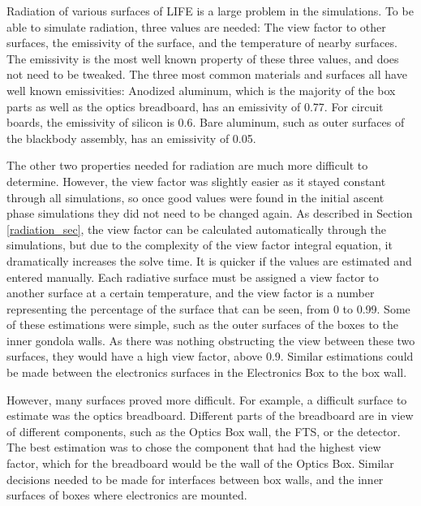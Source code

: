 Radiation of various surfaces of LIFE is a large problem in the simulations. To be able to simulate radiation, three values are needed: The view factor to other surfaces, the emissivity of the surface, and the temperature of nearby surfaces. The emissivity is the most well known property of these three values, and does not need to be tweaked. The three most common materials and surfaces all have well known emissivities: Anodized aluminum, which is the majority of the box parts as well as the optics breadboard, has an emissivity of 0.77. For circuit boards, the emissivity of silicon is 0.6. Bare aluminum, such as outer surfaces of the blackbody assembly, has an emissivity of 0.05. 

The other two properties needed for radiation are much more difficult to determine. However, the view factor was slightly easier as it stayed constant through all simulations, so once good values were found in the initial ascent phase simulations they did not need to be changed again. As described in Section \ref{radiation_sec}, the view factor can be calculated automatically through the simulations, but due to the complexity of the view factor integral equation, it dramatically increases the solve time. It is quicker if the values are estimated and entered manually. Each radiative surface must be assigned a view factor to another surface at a certain temperature, and the view factor is a number representing the percentage of the surface that can be seen, from 0 to 0.99. Some of these estimations were simple, such as the outer surfaces of the boxes to the inner gondola walls. As there was nothing obstructing the view between these two surfaces, they would have a high view factor, above 0.9. Similar estimations could be made between the electronics surfaces in the Electronics Box to the box wall.

However, many surfaces proved more difficult. For example, a difficult surface to estimate was the optics breadboard. Different parts of the breadboard are in view of different components, such as the Optics Box wall, the FTS, or the detector. The best estimation was to chose the component that had the highest view factor, which for the breadboard would be the wall of the Optics Box. Similar decisions needed to be made for interfaces between box walls, and the inner surfaces of boxes where electronics are mounted.

